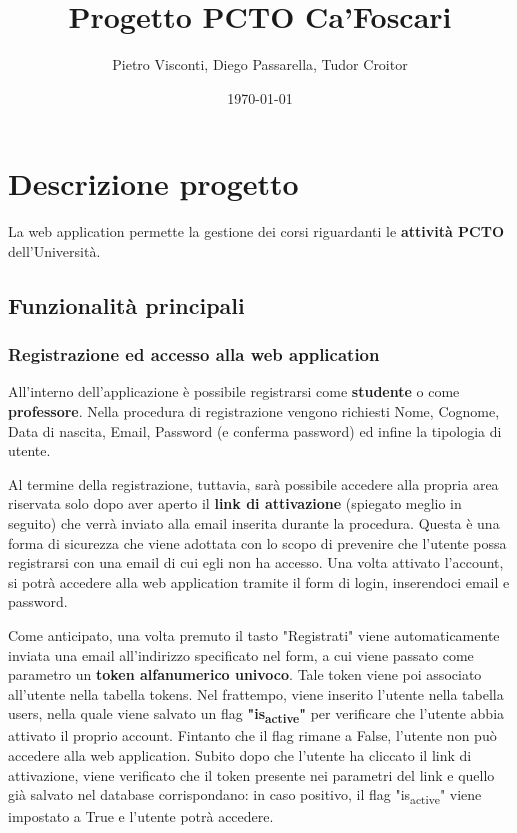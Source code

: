 \documentclass[11pt]{article}
\author{Pietro Visconti, Diego Passarella, Tudor Croitor}
\date{\today}
\title{Progetto PCTO Ca'Foscari}
\begin{document}
\maketitle
\tableofcontents


\section{Descrizione progetto}
\label{sec:orgfcf3849}
La web application permette la gestione dei corsi riguardanti le \textbf{attività PCTO} dell'Università.

\subsection{Funzionalità principali}
\label{sec:org884aa3f}

\subsubsection{Registrazione ed accesso alla web application}
\label{sec:org4321903}
All'interno dell'applicazione è possibile registrarsi come \textbf{studente} o come \textbf{professore}.
Nella procedura di registrazione vengono richiesti Nome, Cognome, Data di nascita, Email, Password (e conferma password) ed infine la tipologia di utente.

Al termine della registrazione, tuttavia, sarà possibile accedere alla propria area riservata solo dopo aver aperto il \textbf{link di attivazione} (spiegato meglio in seguito) che verrà inviato alla email inserita durante la procedura. Questa è una forma di sicurezza che viene adottata con lo scopo di prevenire che l'utente possa registrarsi con una email di cui egli non ha accesso. Una volta attivato l'account, si potrà accedere alla web application tramite il form di login, inserendoci email e password.

Come anticipato, una volta premuto il tasto "Registrati" viene automaticamente inviata una email all'indirizzo specificato nel form, a cui viene passato come parametro un \textbf{token alfanumerico univoco}. Tale token viene poi associato all'utente nella tabella tokens. Nel frattempo, viene inserito l'utente nella tabella users, nella quale viene salvato un flag \textbf{"is\textsubscript{active}"} per verificare che l'utente abbia attivato il proprio account. Fintanto che il flag rimane a False, l'utente non può accedere alla web application. Subito dopo che l'utente ha cliccato il link di attivazione, viene verificato che il token presente nei parametri del link e quello già salvato nel database corrispondano: in caso positivo, il flag "is\textsubscript{active}" viene impostato a True e l'utente potrà accedere.
\end{document}
